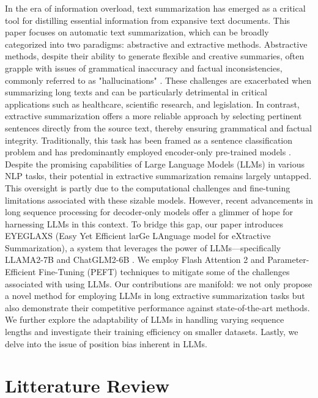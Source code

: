In the era of information overload, text summarization has emerged as a critical tool for distilling essential information from expansive text documents. This paper focuses on automatic text summarization, which can be broadly categorized into two paradigms: abstractive and extractive methods. Abstractive methods, despite their ability to generate flexible and creative summaries, often grapple with issues of grammatical inaccuracy and factual inconsistencies, commonly referred to as "hallucinations" \cite{bishop2022gencomparesum,Ji_2023hallucination,zhang2023sirens}. These challenges are exacerbated when summarizing long texts and can be particularly detrimental in critical applications such as healthcare, scientific research, and legislation. In contrast, extractive summarization offers a more reliable approach by selecting pertinent sentences directly from the source text, thereby ensuring grammatical and factual integrity. Traditionally, this task has been framed as a sentence classification problem and has predominantly employed encoder-only pre-trained models \cite{liu-lapata-2019-text,cho-etal-2022-toward,bian2023gosum}.
Despite the promising capabilities of Large Language Models (LLMs) in various NLP tasks, their potential in extractive summarization remains largely untapped. This oversight is partly due to the computational challenges and fine-tuning limitations associated with these sizable models. However, recent advancements in long sequence processing for decoder-only models offer a glimmer of hope for harnessing LLMs in this context.
To bridge this gap, our paper introduces EYEGLAXS (Easy Yet Efficient larGe LAnguage model for eXtractive Summarization), a system that leverages the power of LLMs—specifically LLAMA2-7B\cite{touvron2023llama} and ChatGLM2-6B \cite{zeng2022glm}. We employ Flash Attention 2 \cite{dao2023flashattention2} and Parameter-Efficient Fine-Tuning (PEFT)\cite{lialin2023scaling} techniques to mitigate some of the challenges associated with using LLMs. Our contributions are manifold: we not only propose a novel method for employing LLMs in long extractive summarization tasks but also demonstrate their competitive performance against state-of-the-art methods. We further explore the adaptability of LLMs in handling varying sequence lengths and investigate their training efficiency on smaller datasets. Lastly, we delve into the issue of position bias inherent in LLMs.

\section{Litterature Review}

